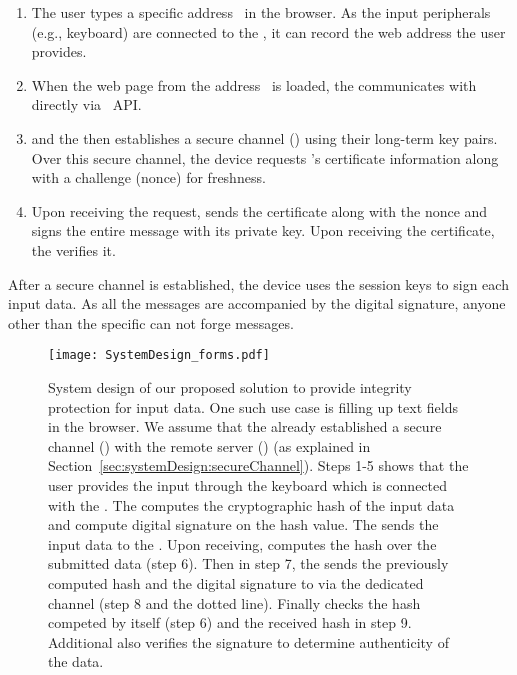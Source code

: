 \begin{enumerate}
  \item The user types a specific address \server\ in the browser. As the input peripherals (e.g., keyboard) are connected to the \device, it can record the web address the user provides.
  
  \item When the web page from the address \server\ is loaded, the \device communicates with \server directly via \webusb\ API.
  
  \item \server and the \device then establishes a secure channel (\tls) using their long-term key pairs. Over this secure channel, the device requests \server's certificate information along with a challenge (nonce) for freshness.
  
  \item Upon receiving the request, \server sends the certificate along with the nonce and signs the entire message with its private key. Upon receiving the certificate, the \device verifies it.
  

\end{enumerate}  

After a secure channel is established, the device uses the session keys to sign each input data. %
As all the messages are accompanied by the digital signature, anyone other than the specific \device can not forge messages.


\begin{figure*}[t]
 \centering
 \texttt{[image: SystemDesign\_forms.pdf]}
 \caption{System design of our proposed solution to provide integrity protection for input data. One such use case is filling up text fields in the browser. We assume that the \device already established a secure channel (\tls) with the remote server (\server) (as explained in Section~\ref{sec:systemDesign:secureChannel}). Steps 1-5 shows that the user provides the input through the keyboard which is connected with the \device. The \device computes the cryptographic hash of the input data and compute digital signature on the hash value. The \device sends the input data to the \server. Upon receiving, \server computes the hash over the submitted data (step 6). Then in step 7, the \device sends the previously computed hash and the digital signature to \server via the dedicated \tls channel (step 8 and the dotted line). Finally \server checks the hash competed by itself (step 6) and the received hash in step 9. Additional \server also verifies the signature to determine authenticity of the data.}
 \label{fig:systemDesignForms}
\end{figure*}

